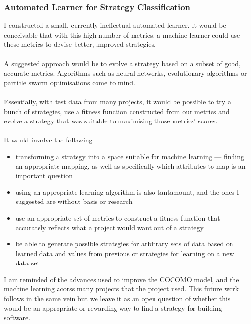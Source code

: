 \subsubsection{Automated Learner for Strategy Classification}
I constructed a small, currently ineffectual automated learner.
It would be conceivable that with this high number of metrics, a machine learner
could use these metrics to devise better, improved strategies.\\
\\
A suggested approach would be to evolve a strategy based on a subset of good,
accurate metrics.
Algorithms such as neural networks, evolutionary algorithms or particle swarm
optimisations come to mind.\\
\\
Essentially, with test data from many projects, it would be possible to try a
bunch of strategies, use a fitness function constructed from our metrics and
evolve a strategy that was suitable to maximising those metrics' scores.\\
\\
It would involve the following
\begin{itemize}
  \item transforming a strategy into a space suitable for machine learning ---
  finding an appropriate mapping, as well as specifically which attributes to
  map is an important question
  \item using an appropriate learning algorithm is also tantamount, and the ones
  I suggested are without basis or research
  \item use an appropriate set of metrics to construct a fitness function that
  accurately reflects what a project would want out of a strategy
  \item be able to generate possible strategies for arbitrary sets of data based
  on learned data and values from previous or strategies for learning on a new
  data set
\end{itemize}

I am reminded of the advances used to improve the COCOMO model, and the machine
learning acorss many projects that the project used.
This future work follows in the same vein but we leave it as an open question of
whether this would be an appropriate or rewarding way to find a strategy for
building software.
